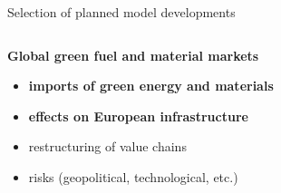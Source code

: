 \documentclass[10pt,aspectratio=169,dvipsnames]{beamer}
\begin{document}
\begin{frame}{Selection of planned model developments}
\begin{columns}[T]
\begin{column}{.5\textwidth}
        \vspace{-0.03\textheight} %
        
        \begin{minipage}[t][.45\textheight]{\linewidth}
            \begin{alertblock}{\textbf{Global green fuel and material markets}}
              \begin{itemize}
                \item \textbf{imports of green energy and materials}
                \item \textbf{effects on European infrastructure}
                \item restructuring of value chains
                \item risks (geopolitical, technological, etc.) \newline
              \end{itemize}
            \end{alertblock}
        \end{minipage}
    \end{column}
\end{columns}
\end{frame}
\end{document}
